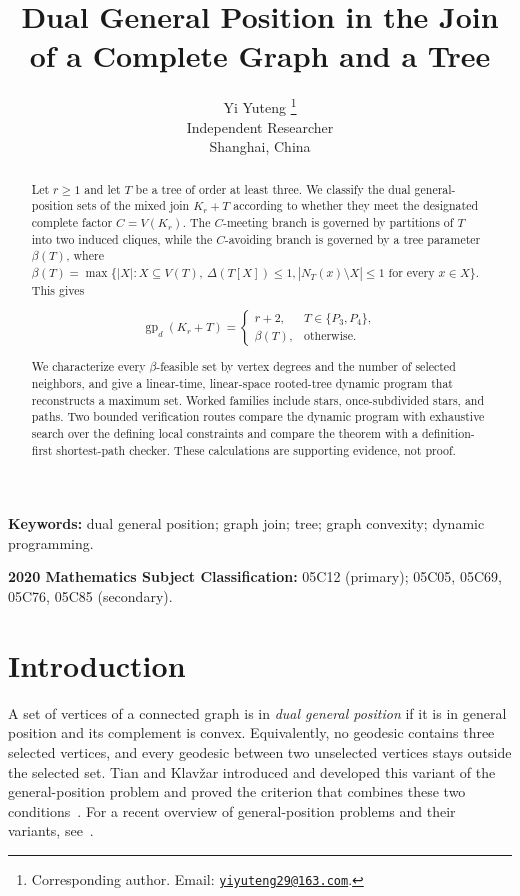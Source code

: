 \documentclass[11pt,a4paper]{article}
\title{Dual General Position in the Join of a Complete Graph and a Tree}
\author{%
  Yi Yuteng%
  \thanks{Corresponding author. Email:
  \href{mailto:yiyuteng29@163.com}{\texttt{yiyuteng29@163.com}}.}\\
  \small Independent Researcher\\
  \small Shanghai, China}
\date{}
\numberwithin{equation}{section}
\begin{document}
\maketitle
\linenumbers

\begin{abstract}

Let \(r\ge 1\) and let \(T\) be a tree of order at least three. We
classify the dual general-position sets of the mixed join \(K_r+T\)
according to whether they meet the designated complete factor
\(C=V(K_r)\). The \(C\)-meeting
branch is governed by partitions of \(T\) into two induced cliques,
while the \(C\)-avoiding branch is governed by a tree parameter
\(\beta(T)\), where
\(\beta(T)=\max\{|X|:X\subseteq V(T),\ \Delta(T[X])\le 1,
|N_T(x)\setminus X|\le 1\text{ for every }x\in X\}\). This gives

\[
\operatorname{gp}_d(K_r+T)=
\begin{cases}
r+2,&T\in\{P_3,P_4\},\\
\beta(T),&\text{otherwise}.
\end{cases}
\]

We characterize every \(\beta\)-feasible set by vertex degrees and the
number of selected neighbors, and give a linear-time, linear-space
rooted-tree dynamic program that reconstructs a maximum set. Worked
families include stars, once-subdivided stars, and paths. Two bounded
verification routes compare the dynamic program with exhaustive search over
the defining local constraints and compare the theorem with a definition-first
shortest-path checker. These calculations are supporting evidence, not proof.
\end{abstract}

\noindent\textbf{Keywords:} dual general position; graph join; tree;
graph convexity; dynamic programming.

\medskip
\noindent\textbf{2020 Mathematics Subject Classification:}
05C12 (primary); 05C05, 05C69, 05C76, 05C85 (secondary).

\section{Introduction}\label{sec:introduction}

A set of vertices of a connected graph is in \emph{dual general
position} if it is in general position and its complement is convex.
Equivalently, no geodesic contains three selected vertices, and every
geodesic between two unselected vertices stays outside the selected set.
Tian and Klav\v{z}ar introduced and developed this variant of the
general-position problem and proved the criterion that combines these
two conditions~\cite{tian-klavzar-variety}. For a recent overview of
general-position problems and their variants, see~\cite{chandran-et-al-survey}.
\end{document}
